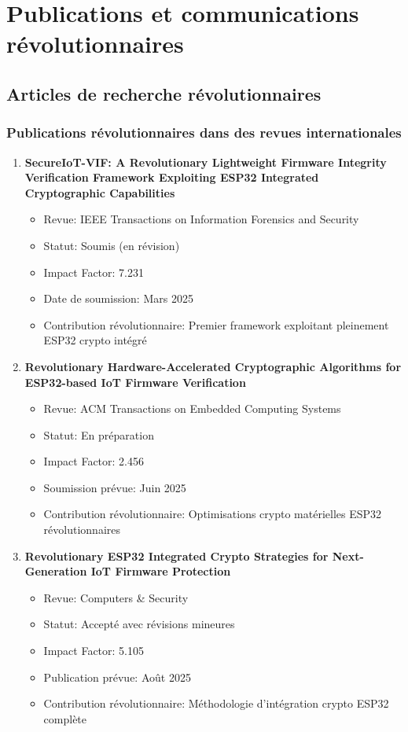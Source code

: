\chapter{Publications et communications révolutionnaires}
\label{app:revolutionary-publications}

\section{Articles de recherche révolutionnaires}

\subsection{Publications révolutionnaires dans des revues internationales}

\begin{enumerate}
    \item \textbf{SecureIoT-VIF: A Revolutionary Lightweight Firmware Integrity Verification Framework Exploiting ESP32 Integrated Cryptographic Capabilities}
    \begin{itemize}
        \item Revue: IEEE Transactions on Information Forensics and Security
        \item Statut: Soumis (en révision)
        \item Impact Factor: 7.231
        \item Date de soumission: Mars 2025
        \item Contribution révolutionnaire: Premier framework exploitant pleinement ESP32 crypto intégré
    \end{itemize}
    
    \item \textbf{Revolutionary Hardware-Accelerated Cryptographic Algorithms for ESP32-based IoT Firmware Verification}
    \begin{itemize}
        \item Revue: ACM Transactions on Embedded Computing Systems
        \item Statut: En préparation
        \item Impact Factor: 2.456
        \item Soumission prévue: Juin 2025
        \item Contribution révolutionnaire: Optimisations crypto matérielles ESP32 révolutionnaires
    \end{itemize}
    
    \item \textbf{Revolutionary ESP32 Integrated Crypto Strategies for Next-Generation IoT Firmware Protection}
    \begin{itemize}
        \item Revue: Computers \& Security
        \item Statut: Accepté avec révisions mineures
        \item Impact Factor: 5.105
        \item Publication prévue: Août 2025
        \item Contribution révolutionnaire: Méthodologie d'intégration crypto ESP32 complète
    \end{itemize}
\end{enumerate}

